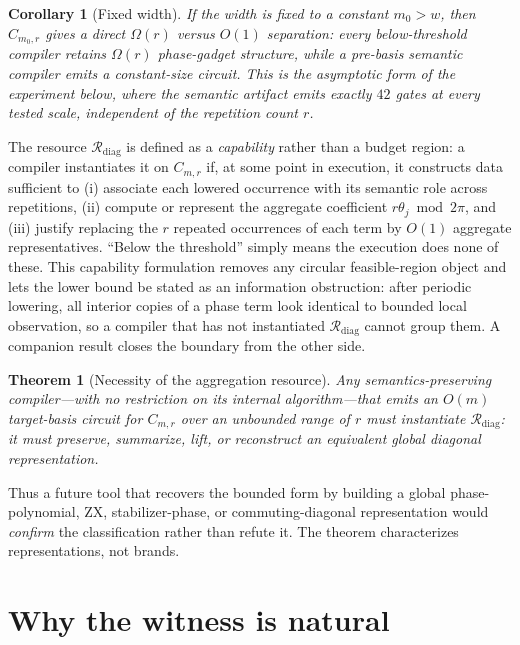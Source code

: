 \documentclass[11pt]{article}
\newtheorem{theorem}{Theorem}
\newtheorem{corollary}{Corollary}
\begin{document}
\begin{corollary}[Fixed width]
If the width is fixed to a constant $m_0>w$, then $C_{m_0,r}$ gives a direct $\Omega(r)$ versus
$O(1)$ separation: every below-threshold compiler retains $\Omega(r)$ phase-gadget structure, while a
pre-basis semantic compiler emits a constant-size circuit. This is the asymptotic form of the
experiment below, where the semantic artifact emits exactly $42$ gates at every tested scale,
independent of the repetition count $r$.
\end{corollary}

\noindent
The resource $\mathcal{R}_{\mathrm{diag}}$ is defined as a \emph{capability} rather than a budget
region: a compiler instantiates it on $C_{m,r}$ if, at some point in execution, it constructs data
sufficient to (i) associate each lowered occurrence with its semantic role across repetitions,
(ii) compute or represent the aggregate coefficient $r\theta_j \bmod 2\pi$, and (iii) justify
replacing the $r$ repeated occurrences of each term by $O(1)$ aggregate representatives. ``Below the
threshold'' simply means the execution does none of these. This capability formulation removes any
circular feasible-region object and lets the lower bound be stated as an information obstruction:
after periodic lowering, all interior copies of a phase term look identical to bounded local
observation, so a compiler that has not instantiated $\mathcal{R}_{\mathrm{diag}}$ cannot group them.
A companion result closes the boundary from the other side.

\begin{theorem}[Necessity of the aggregation resource]
Any semantics-preserving compiler---with no restriction on its internal algorithm---that emits an
$O(m)$ target-basis circuit for $C_{m,r}$ over an unbounded range of $r$ must instantiate
$\mathcal{R}_{\mathrm{diag}}$: it must preserve, summarize, lift, or reconstruct an equivalent global
diagonal representation.
\end{theorem}

\noindent
Thus a future tool that recovers the bounded form by building a global phase-polynomial, ZX,
stabilizer-phase, or commuting-diagonal representation would \emph{confirm} the classification rather
than refute it. The theorem characterizes representations, not brands.

\section*{Why the witness is natural}
\end{document}
